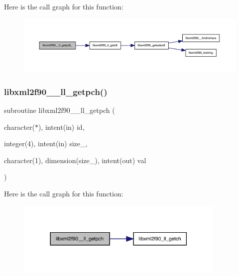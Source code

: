 Here is the call graph for this function\+:
\nopagebreak
\begin{figure}[H]
\begin{center}
\leavevmode
\includegraphics[width=350pt]{libxml2f90_8f90__pp_8f90_adf6af0ff041c73c9d338df8a99c88137_cgraph}
\end{center}
\end{figure}
\mbox{\label{libxml2f90_8f90__pp_8f90_aa79b29b7afab3cf465e4d7b328007346}} 
\subsubsection{\texorpdfstring{libxml2f90\+\_\+\+\_\+ll\+\_\+getpch()}{libxml2f90\_\_ll\_getpch()}}
{\footnotesize\ttfamily subroutine libxml2f90\+\_\+\+\_\+ll\+\_\+getpch (\begin{DoxyParamCaption}\item[{character($\ast$), intent(in)}]{id,  }\item[{integer(4), intent(in)}]{size\+\_\+,  }\item[{character(1), dimension(size\+\_\+), intent(out)}]{val }\end{DoxyParamCaption})}

Here is the call graph for this function\+:
\nopagebreak
\begin{figure}[H]
\begin{center}
\leavevmode
\includegraphics[width=285pt]{libxml2f90_8f90__pp_8f90_aa79b29b7afab3cf465e4d7b328007346_cgraph}
\end{center}
\end{figure}
\mbox{\label{libxml2f90_8f90__pp_8f90_a02ca594441825f41fac314030efac043}} 
